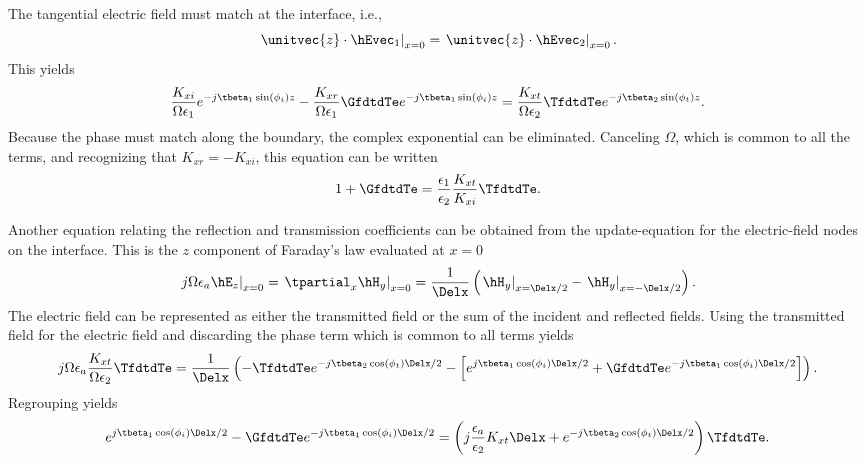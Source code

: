 The tangential electric field must match at the interface, i.e., 
\begin{equation}
  \left.\unitvec{z}\cdot\hEvec_1\right|_{x=0}
  = 
  \left.\unitvec{z}\cdot\hEvec_2\right|_{x=0}.
\end{equation}
This yields
\begin{equation}
  \frac{K_{xi}}{\Omega\epsilon_1} e^{-j \tbeta_1 \sin(\phi_i) z} 
  -\frac{K_{xr}}{\Omega\epsilon_1} \GfdtdTe e^{-j \tbeta_1 \sin(\phi_i) z}
  =   
  \frac{K_{xt}}{\Omega\epsilon_2} \TfdtdTe e^{-j \tbeta_2 \sin(\phi_t)z}.
\end{equation}
Because the phase must match along the boundary, the complex
exponential can be eliminated.  Canceling $\Omega$, which is
common to all the terms, and recognizing that $K_{xr}=-K_{xi}$, this
equation can be written
\begin{equation}
  1 + \GfdtdTe = \frac{\epsilon_1}{\epsilon_2}
                 \frac{K_{xt}}{K_{xi}} \TfdtdTe.
  \label{eq:teYEmatch}
\end{equation}


Another equation relating the reflection and transmission coefficients
can be obtained from the update-equation for the electric-field nodes
on the interface.  This is the $z$ component of Faraday's law
evaluated at $x=0$
\begin{equation}
  \left.j \Omega \epsilon_a \hE_z \right|_{x=0}
  = \left.\tpartial_x \hH_y\right|_{x=0}
  = \frac{1}{\Delx} 
    \left(\left.\hH_y\right|_{x=\Delx/2} -
          \left.\hH_y\right|_{x=-\Delx/2}\right).
\end{equation}
The electric field can be represented as either the transmitted field
or the sum of the incident and reflected fields.  Using the
transmitted field for the electric field and discarding the phase term
which is common to all terms yields
\begin{equation}
  j\Omega \epsilon_a \frac{K_{xt}}{\Omega\epsilon_2} \TfdtdTe 
  =
  \frac{1}{\Delx}
  \left(-\TfdtdTe e^{-j \tbeta_2 \cos(\phi_t)\Delx/2}
   -\left[e^{j \tbeta_1 \cos(\phi_i)\Delx/2} + 
      \GfdtdTe e^{-j \tbeta_1 \cos(\phi_i)\Delx/2}\right]\right).
\end{equation}
Regrouping yields
\begin{equation}
  e^{j \tbeta_1 \cos(\phi_i)\Delx/2} -
  \GfdtdTe e^{-j \tbeta_1 \cos(\phi_i)\Delx/2}  =
  \left(j\frac{\epsilon_a}{\epsilon_2} K_{xt}\Delx +
      e^{-j \tbeta_2 \cos(\phi_t)\Delx/2}\right)\TfdtdTe.
  \label{eq:teYFaraday}
\end{equation}


